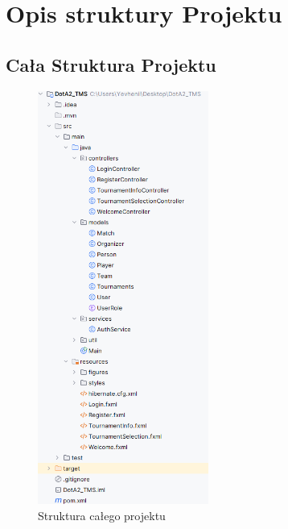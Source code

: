 \chapter{Opis struktury Projektu}
\label{cha:opisStrukturyProjektu}


\section{Cała Struktura Projektu}
\begin{figure}[h!]
    \centering
    \includegraphics[width=0.5\textwidth]{figures/Structure.png}
    \caption{Struktura całego projektu \label{fig1}}
\end{figure}
